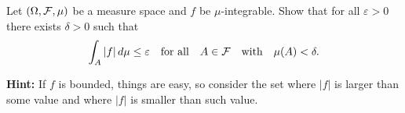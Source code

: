 \begin{problem}
	Let $(\Omega,\mathcal F,\mu)$ be a measure space and $f$ be $\mu$-integrable. Show that for all $\varepsilon>0$ there exists $\delta>0$ such that
	\[
		\int_A |f|\,d\mu\le \varepsilon\quad \text{for all}\quad A\in\mathcal F\quad \text{with}\quad \mu(A)<\delta.
	\]
	
\smallskip
	
	\noindent\textbf{Hint:} If $f$ is bounded, things are easy, so consider the set where $|f|$ is larger than some value and where $|f|$ is smaller than such value.
\end{problem}



